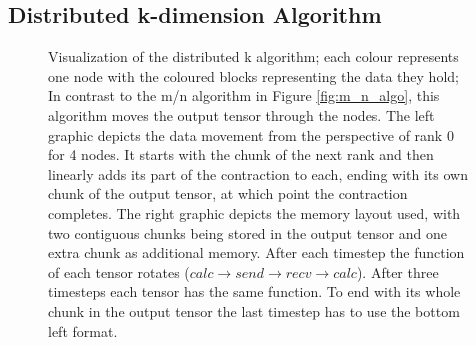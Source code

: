 
\subsection{Distributed k-dimension Algorithm}

\begin{figure}[ht]
    \caption{Visualization of the distributed k algorithm; 
    each colour represents one node with the coloured blocks representing the data they hold; 
    In contrast to the m/n algorithm in Figure \ref{fig:m_n_algo}, this algorithm moves the output tensor through the nodes.
    The left graphic depicts the data movement from the perspective of rank 0 for 4 nodes.
    It starts with the chunk of the next rank and then linearly adds its part of the contraction to each, ending with its own chunk of the output tensor, at which point the contraction completes.
    The right graphic depicts the memory layout used, with two contiguous chunks being stored in the output tensor and one extra chunk as additional memory.
    After each timestep the function of each tensor rotates ($calc \rightarrow send \rightarrow recv \rightarrow calc$).
    After three timesteps each tensor has the same function.
    To end with its whole chunk in the output tensor the last timestep has to use the bottom left format.
    }
    \label{fig:k_algo}
\end{figure}


